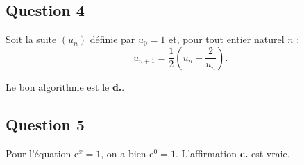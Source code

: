 \documentclass[10pt]{article}
\providecommand{\e}{{\mathrm{e}}}
\begin{document}
\subsection*{Question 4}

Soit la suite \((u_n)\) définie par \(u_0 = 1\) et, pour tout entier naturel \(n\) :
\[
u_{n+1} = \dfrac{1}{2} \left( u_n + \dfrac{2}{u_n} \right).
\]

Le bon algorithme est le \textbf{d.}.

\subsection*{Question 5}

Pour l'équation \(\e^x = 1\), on a bien \(\e^0 = 1\). L'affirmation \textbf{c.} est vraie.
\end{document}
